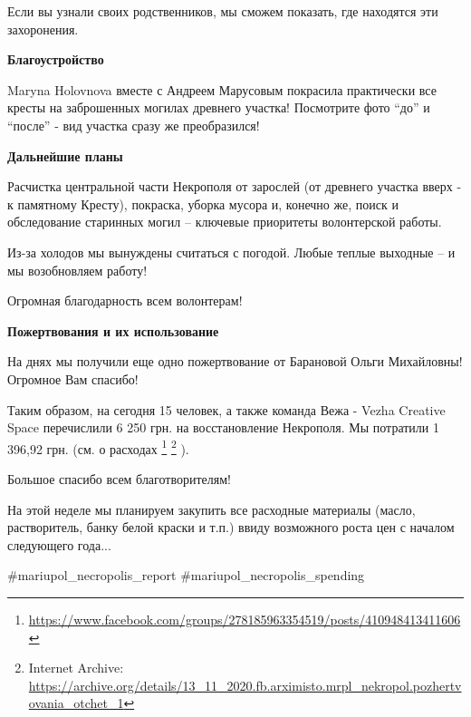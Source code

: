 Если вы узнали своих родственников, мы сможем показать, где находятся эти
захоронения.

\textbf{Благоустройство}

Maryna Holovnova вместе с Андреем Марусовым покрасила практически все кресты на
заброшенных могилах древнего участка! Посмотрите фото \enquote{до} и \enquote{после} - вид
участка сразу же преобразился!

\textbf{Дальнейшие планы}

Расчистка центральной части Некрополя от зарослей (от древнего участка вверх -
к памятному Кресту), покраска, уборка мусора и, конечно же, поиск и
обследование старинных могил – ключевые приоритеты волонтерской работы.

Из-за холодов мы вынуждены считаться с погодой. Любые теплые выходные – и мы
возобновляем работу!

Огромная благодарность всем волонтерам!

\textbf{Пожертвования и их использование}

На днях мы получили еще одно пожертвование от Барановой Ольги Михайловны!
Огромное Вам спасибо!

Таким образом, на сегодня 15 человек, а также команда Вежа - Vezha Creative
Space перечислили 6 250 грн. на восстановление Некрополя. Мы потратили 1 396,92
грн. (см. о расходах
\footnote{\url{https://www.facebook.com/groups/278185963354519/posts/410948413411606}} %
\footnote{Internet Archive: \url{https://archive.org/details/13_11_2020.fb.arximisto.mrpl_nekropol.pozhertvovania_otchet_1}}
).

Большое спасибо всем благотворителям!

На этой неделе мы планируем закупить все расходные материалы (масло,
растворитель, банку белой краски и т.п.) ввиду возможного роста цен с началом
следующего года...

\#mariupol\_necropolis\_report
\#mariupol\_necropolis\_spending
